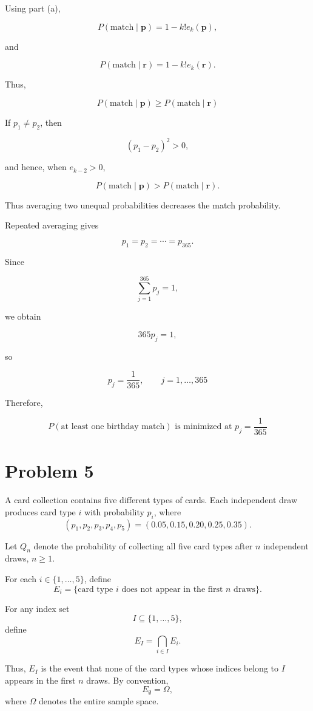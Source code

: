 \documentclass{article}
\begin{document}
Using part (a),

\[
P(\text{match}\mid\mathbf p)
=
1-k!e_k(\mathbf p),
\]

and

\[
P(\text{match}\mid\mathbf r)
=
1-k!e_k(\mathbf r).
\]

Thus,

\[
P(\text{match}\mid\mathbf p)
\ge
P(\text{match}\mid\mathbf r)
\]

If \(p_1\ne p_2\), then

\[
(p_1-p_2)^2>0,
\]

and hence, when \(e_{k-2}>0\),

\[
P(\text{match}\mid\mathbf p)
>
P(\text{match}\mid\mathbf r).
\]

Thus averaging two unequal probabilities decreases the match probability.

Repeated averaging gives

\[
p_1=p_2=\cdots=p_{365}.
\]

Since

\[
\sum_{j=1}^{365}p_j=1,
\]

we obtain

\[
365p_j=1,
\]

so

\[
p_j=\frac1{365},
\qquad
j=1,\ldots,365
\]

Therefore,

\[
P(\text{at least one birthday match})
\text{ is minimized at }
p_j=\frac1{365}
\]





\section*{Problem 5}


\medskip

A card collection contains five different types of cards. Each independent draw produces
card type $i$ with probability $p_i$, where
\[
(p_1,p_2,p_3,p_4,p_5)=(0.05,0.15,0.20,0.25,0.35).
\]

Let $Q_n$ denote the probability of collecting all five card types after $n$ independent
draws, $n\ge 1$.

For each $i\in\{1,\ldots,5\}$, define
\[
E_i=\{\text{card type }i\text{ does not appear in the first }n\text{ draws}\}.
\]

For any index set
\[
I\subseteq\{1,\ldots,5\},
\]
define
\[
E_I=\bigcap_{i\in I}E_i.
\]

Thus, $E_I$ is the event that none of the card types whose indices belong to $I$
appears in the first $n$ draws. By convention,
\[
E_{\emptyset}=\Omega,
\]
where $\Omega$ denotes the entire sample space.
\end{document}
